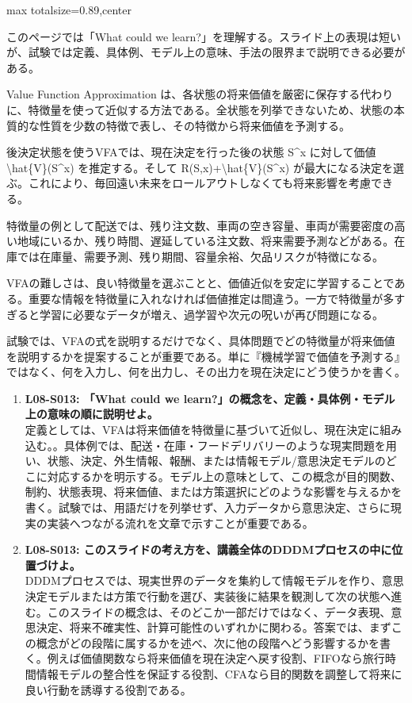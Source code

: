 \begin{minipage}[t]{0.58\textwidth}
\begin{adjustbox}{max totalsize={\textwidth}{0.89\textheight},center}
\begin{minipage}{\textwidth}\scriptsize
{}このページでは「What could we learn?」を理解する。スライド上の表現は短いが、試験では定義、具体例、モデル上の意味、手法の限界まで説明できる必要がある。\par
Value Function Approximation は、各状態の将来価値を厳密に保存する代わりに、特徴量を使って近似する方法である。全状態を列挙できないため、状態の本質的な性質を少数の特徴で表し、その特徴から将来価値を予測する。\par
後決定状態を使うVFAでは、現在決定を行った後の状態 S\textasciicircum{}x に対して価値 \textbackslash{}hat\{V\}(S\textasciicircum{}x) を推定する。そして R(S,x)+\textbackslash{}hat\{V\}(S\textasciicircum{}x) が最大になる決定を選ぶ。これにより、毎回遠い未来をロールアウトしなくても将来影響を考慮できる。\par
特徴量の例として配送では、残り注文数、車両の空き容量、車両が需要密度の高い地域にいるか、残り時間、遅延している注文数、将来需要予測などがある。在庫では在庫量、需要予測、残り期間、容量余裕、欠品リスクが特徴になる。\par
VFAの難しさは、良い特徴量を選ぶことと、価値近似を安定に学習することである。重要な情報を特徴量に入れなければ価値推定は間違う。一方で特徴量が多すぎると学習に必要なデータが増え、過学習や次元の呪いが再び問題になる。\par
試験では、VFAの式を説明するだけでなく、具体問題でどの特徴量が将来価値を説明するかを提案することが重要である。単に『機械学習で価値を予測する』ではなく、何を入力し、何を出力し、その出力を現在決定にどう使うかを書く。\par{}\begin{enumerate}\item \textbf{L08-S013: 「What could we learn?」の概念を、定義・具体例・モデル上の意味の順に説明せよ。}\\定義としては、VFAは将来価値を特徴量に基づいて近似し、現在決定に組み込む。。具体例では、配送・在庫・フードデリバリーのような現実問題を用い、状態、決定、外生情報、報酬、または情報モデル/意思決定モデルのどこに対応するかを明示する。モデル上の意味として、この概念が目的関数、制約、状態表現、将来価値、または方策選択にどのような影響を与えるかを書く。試験では、用語だけを列挙せず、入力データから意思決定、さらに現実の実装へつながる流れを文章で示すことが重要である。\item \textbf{L08-S013: このスライドの考え方を、講義全体のDDDMプロセスの中に位置づけよ。}\\DDDMプロセスでは、現実世界のデータを集約して情報モデルを作り、意思決定モデルまたは方策で行動を選び、実装後に結果を観測して次の状態へ進む。このスライドの概念は、そのどこか一部だけではなく、データ表現、意思決定、将来不確実性、計算可能性のいずれかに関わる。答案では、まずこの概念がどの段階に属するかを述べ、次に他の段階へどう影響するかを書く。例えば価値関数なら将来価値を現在決定へ戻す役割、FIFOなら旅行時間情報モデルの整合性を保証する役割、CFAなら目的関数を調整して将来に良い行動を誘導する役割である。\end{enumerate}

\end{minipage}
\end{adjustbox}
\end{minipage}
